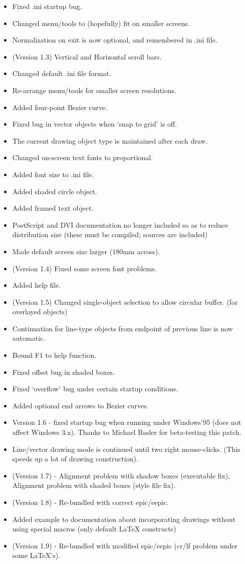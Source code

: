 \documentclass[a4paper]{article}
\begin{document}
\begin{itemize}
    \item Fixed .ini startup bug.
    \item Changed menu/tools to (hopefully) fit on smaller screens.
    \item Normalization on exit is now optional, and remembered in .ini file.
    \item (Version 1.3) Vertical and Horizontal scroll bars.
    \item Changed default .ini file format.
    \item Re-arrange menu/tools for smaller screen resolutions.
    \item Added four-point Bezier curve.
    \item Fixed bug in vector objects when `snap to grid' is off.
    \item The current drawing object type is maintained after each draw.
    \item Changed on-screen text fonts to proportional.
    \item Added font size to .ini file.
    \item Added shaded circle object.
    \item Added framed text object.
    \item PostScript and DVI documentation no longer included so as to reduce
        distribution size (these must be compiled; sources are included)
    \item Made default screen size larger (180mm across).
    \item (Version 1.4) Fixed some screen font problems.
    \item Added help file.
    \item (Version 1.5) Changed single-object selection to allow circular buffer.
        (for overlayed objects)
    \item Continuation for line-type objects from endpoint of previous line is now automatic.
    \item Bound F1 to help function.
    \item Fixed offset bug in shaded boxes.
    \item Fixed `overflow' bug under certain startup conditions.
    \item Added optional end arrows to Bezier curves.
    \item Version 1.6 - fixed startup bug when running under
        Windows'95 (does not affect Windows 3.x). Thanks to
        Michael Basler for beta-testing this patch.
    \item Line/vector drawing mode is continued until two right mouse-clicks.
        (This speeds up a lot of drawing construction).
    \item (Version 1.7) - Alignment problem with shadow boxes (executable fix),
        Alignment problem with shaded boxes (style file fix).
    \item (Version 1.8) - Re-bundled with correct epic/eepic.
    \item Added example to documentation about incorporating drawings
            without using special macros (only default \LaTeX\/ constructs)
    \item (Version 1.9) - Re-bundled with modified epic/eepic
        (cr/lf problem under some \LaTeX's).
\end{itemize}
\end{document}
